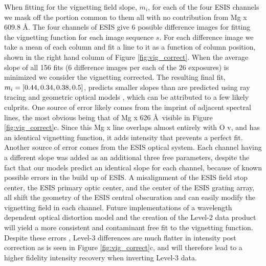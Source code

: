         When fitting for the vignetting field slope, $m_i$, for each  of the four ESIS channels we mask off the portion common to them all with no contribution from Mg {\sc x} 609.8 \AA. 
        The four channels of ESIS give 6 possible difference images for fitting the vignetting function for each image sequence $s$. 
        For each difference image we take a mean of each column and fit a line to it as a function of column position, shown in the right hand column of Figure \ref{fig:vig_correct}.
        When the average slope of all 156 fits (6 difference images per each of the 26 exposures) is minimized we consider the vignetting corrected. 
        The resulting final fit, $m_i = [0.44, 0.34, 0.38, 0.5]$, predicts smaller slopes than are predicted using ray tracing and geometric optical models \citep{ESIS}, which can be attributed to a few likely culprits.
        One source of error likely comes from the imprint of adjacent spectral lines, the most obvious being that of Mg {\sc x} 626 \AA \ visible in Figure \ref{fig:vig_correct}c.
        Since this Mg {\sc x} line overlaps almost entirely with O {\sc v}, and has an identical vignetting function, it adds intensity that prevents a perfect fit. 
        Another source of error comes from the ESIS optical system.
        Each channel having a different slope was added as an additional three free parameters, despite the fact that our models predict an identical slope for each channel, because of known possible errors in the build up of ESIS.
        A misalignment of the ESIS field stop center, the ESIS primary optic center, and the center of the ESIS grating array, all shift the geometry of the ESIS central obscuration and can easily modify the vignetting field in each channel.
        Future implementations of a wavelength dependent optical distortion model and the creation of the Level-2 data product will yield a more consistent and contaminant free fit to the vignetting function. 
        Despite these errors , Level-3 differences are much flatter in intensity post correction as is seen in Figure \ref{fig:vig_correct}c, and will therefore lead to a higher fidelity intensity recovery when inverting Level-3 data.
        

